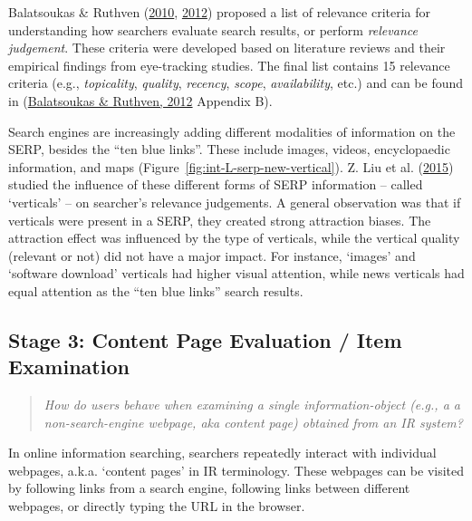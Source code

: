 \documentclass[letterpaper, nobind]{templates/ociamthesis}
\begin{document}
Balatsoukas \& Ruthven (\protect\hyperlink{ref-114}{2010}, \protect\hyperlink{ref-119}{2012}) proposed a list of relevance criteria for understanding
how searchers evaluate search results, or perform \emph{relevance judgement}.
These criteria were developed based on literature reviews and their
empirical findings from eye-tracking studies. The final list contains 15
relevance criteria (e.g., \emph{topicality}, \emph{quality}, \emph{recency}, \emph{scope},
\emph{availability}, etc.) and can be found in (\protect\hyperlink{ref-119}{Balatsoukas \& Ruthven, 2012} Appendix B).

Search engines are increasingly adding different modalities of
information on the SERP, besides the ``ten blue links''. These include
images, videos, encyclopaedic information, and maps
(Figure~\ref{fig:int-L-serp-new-vertical}). Z. Liu et al. (\protect\hyperlink{ref-128}{2015}) studied the influence of
these different forms of SERP information -- called `verticals' -- on
searcher's relevance judgements. A general observation was that if
verticals were present in a SERP, they created strong attraction biases.
The attraction effect was influenced by the type of verticals, while the
vertical quality (relevant or not) did not have a major impact. For
instance, `images' and `software download' verticals had higher visual
attention, while news verticals had equal attention as the ``ten blue
links'' search results.

\hypertarget{sec-bg-search-content-page}{%
\subsection{Stage 3: Content Page Evaluation / Item Examination}\label{sec-bg-search-content-page}}

\begin{quote}
\emph{How do users behave when examining a single information-object (e.g., a
a non-search-engine webpage, aka content page) obtained from an IR
system?}
\end{quote}

In online information searching, searchers repeatedly interact with
individual webpages, a.k.a. `content pages' in IR terminology. These
webpages can be visited by following links from a search engine,
following links between different webpages, or directly typing the URL
in the browser.
\end{document}
